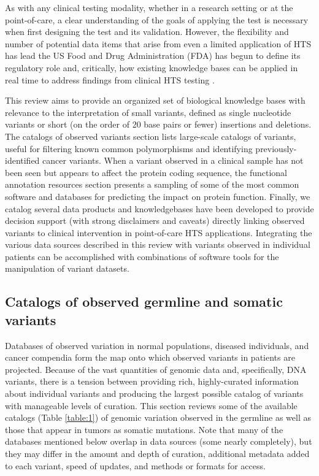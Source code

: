 \documentclass{article}
\begin{document}
As with any clinical testing modality, whether in a research setting
or at the point-of-care, a clear understanding of the goals of
applying the test is necessary when first designing the test and its
validation. However, the flexibility and number of potential data
items that arise from even a limited application of HTS has lead the
US Food and Drug Administration (FDA) has begun to define its
regulatory role \cite{Fda2015-kv} and, critically, how existing
knowledge bases can be applied in real time to address findings from
clinical HTS testing \cite{Fda2016-kx}.

This review aims to provide an organized set of biological knowledge
bases with relevance to the interpretation of small variants, defined
as single nucleotide variants or short (on the order of 20 base pairs
or fewer) insertions and deletions. The catalogs of observed variants
section lists large-scale catalogs of variants, useful for filtering
known common polymorphisms and identifying previously-identified
cancer variants. When a variant observed in a clinical sample has not
been seen but appears to affect the protein coding sequence, the
functional annotation resources section presents a sampling of some of
the most common software and databases for predicting the impact on
protein function. Finally, we catalog several data products and
knowledgebases have been developed to provide decision support (with
strong disclaimers and caveats) directly linking observed variants to
clinical intervention in point-of-care HTS applications. Integrating
the various data sources described in this review with variants
observed in individual patients can be accomplished with combinations
of software tools for the manipulation of variant datasets.

\subsection{Catalogs of observed germline and somatic variants}

Databases of observed variation in normal populations,
diseased individuals, and cancer compendia form the map onto which
observed variants in patients are projected. Because of the vast
quantities of genomic data and, specifically, DNA variants, there is a
tension between providing rich, highly-curated information about
individual variants and producing the largest possible catalog of
variants with manageable levels of curation. This section reviews some
of the available catalogs (Table \ref{table:1}) of genomic variation observed
in the germline as well as those that appear in tumors as somatic
mutations.  Note that many of the databases mentioned below overlap in
data sources (some nearly completely), but they may differ in the
amount and depth of curation, additional metadata added to each
variant, speed of updates, and methods or formats for access.
\end{document}
